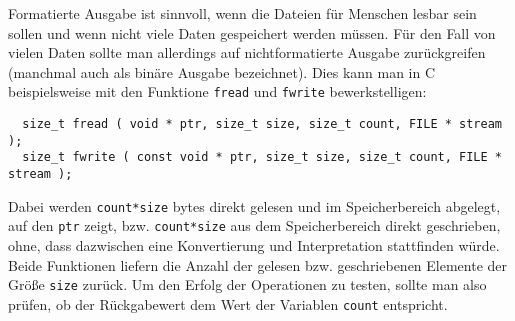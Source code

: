 Formatierte Ausgabe ist sinnvoll, wenn die Dateien für Menschen lesbar sein sollen und wenn nicht viele Daten gespeichert werden müssen.
Für den Fall von vielen Daten sollte man allerdings auf nichtformatierte Ausgabe zurückgreifen (manchmal auch als binäre Ausgabe bezeichnet).
Dies kann man in C beispielsweise mit den Funktione \texttt{fread} und \texttt{fwrite} bewerkstelligen:
\begin{lstlisting}
  size_t fread ( void * ptr, size_t size, size_t count, FILE * stream );
  size_t fwrite ( const void * ptr, size_t size, size_t count, FILE * stream );
\end{lstlisting}
Dabei werden \verb|count*size| bytes direkt gelesen und im Speicherbereich abgelegt, auf den \verb|ptr| zeigt, bzw. \verb|count*size| aus dem Speicherbereich direkt geschrieben, ohne, dass dazwischen eine Konvertierung und Interpretation stattfinden würde.
Beide Funktionen liefern die Anzahl der gelesen bzw. geschriebenen Elemente der Größe \verb|size| zurück.
Um den Erfolg der Operationen zu testen, sollte man also prüfen, ob der Rückgabewert dem Wert der Variablen \verb|count| entspricht.

